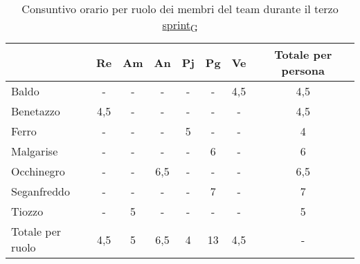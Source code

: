 \begin{table}[!h]
	\centering
	\begin{tabular}{ | l | c | c | c | c | c | c | c | }
		\hline
		\textbf{}        & \textbf{Re} & \textbf{Am} & \textbf{An} & \textbf{Pj} & \textbf{Pg} & \textbf{Ve} & \textbf{Totale per persona} \\
		\hline
		Baldo            & -           & -           & -           & -           & -           & 4,5         & 4,5                         \\
		Benetazzo        & 4,5         & -           & -           & -           & -           & -           & 4,5                         \\
		Ferro            & -           & -           & -           & 5           & -           & -           & 4                           \\
		Malgarise        & -           & -           & -           & -           & 6           & -           & 6                           \\
		Occhinegro       & -           & -           & 6,5         & -           & -           & -           & 6,5                         \\
		Seganfreddo      & -           & -           & -           & -           & 7           & -           & 7                           \\
		Tiozzo           & -           & 5           & -           & -           & -           & -           & 5                           \\
		\hline
		Totale per ruolo & 4,5         & 5           & 6,5         & 4           & 13          & 4,5         & -                           \\
		\hline
	\end{tabular}
	\caption{Consuntivo orario per ruolo dei membri del team durante il terzo \href{https://7last.github.io/docs/pb/documentazione-interna/glossario\#sprint}{sprint\textsubscript{G}}}
	
\end{table}

